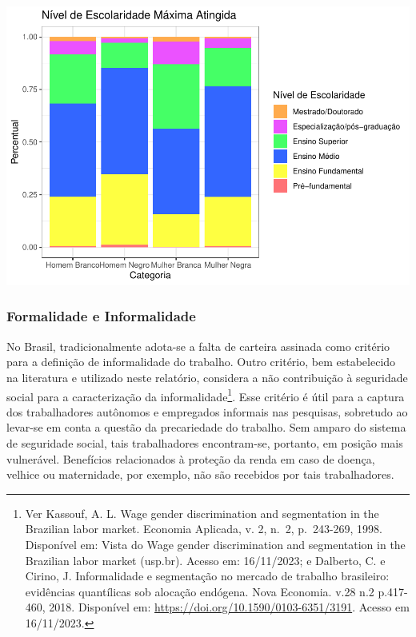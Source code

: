 \documentclass[
]{article}
\begin{document}
\includegraphics{R-Markdown--Long-Version-_files/figure-latex/unnamed-chunk-12-1.pdf}

\hypertarget{formalidade-e-informalidade}{%
\subsubsection{Formalidade e
Informalidade}\label{formalidade-e-informalidade}}

No Brasil, tradicionalmente adota-se a falta de carteira assinada como
critério para a definição de informalidade do trabalho. Outro critério,
bem estabelecido na literatura e utilizado neste relatório, considera a
não contribuição à seguridade social para a caracterização da
informalidade\footnote{Ver Kassouf, A. L. Wage gender discrimination and
  segmentation in the Brazilian labor market. Economia Aplicada, v. 2,
  n.~2, p.~243-269, 1998. Disponível em: Vista do Wage gender
  discrimination and segmentation in the Brazilian labor market
  (usp.br). Acesso em: 16/11/2023; e Dalberto, C. e Cirino, J.
  Informalidade e segmentação no mercado de trabalho brasileiro:
  evidências quantílicas sob alocação endógena. Nova Economia. v.28 n.2
  p.417-460, 2018. Disponível em:
  \url{https://doi.org/10.1590/0103-6351/3191}. Acesso em 16/11/2023.}.
Esse critério é útil para a captura dos trabalhadores autônomos e
empregados informais nas pesquisas, sobretudo ao levar-se em conta a
questão da precariedade do trabalho. Sem amparo do sistema de seguridade
social, tais trabalhadores encontram-se, portanto, em posição mais
vulnerável. Benefícios relacionados à proteção da renda em caso de
doença, velhice ou maternidade, por exemplo, não são recebidos por tais
trabalhadores.
\end{document}
